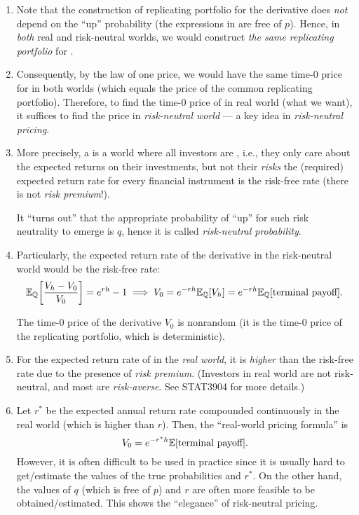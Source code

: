 \begin{enumerate}
\item Note that the construction of replicating portfolio for the derivative
 does \emph{not} depend on the ``up'' probability (the
expressions in  are free of \(p\)). Hence, in
\emph{both} real and risk-neutral worlds, we would construct \emph{the same
replicating portfolio} for .

\item Consequently, by the law of one price, we would have the same time-0 price
for  in both worlds (which equals the price of the common
replicating portfolio). Therefore, to find the time-0 price of 
in real world (what we want), it suffices to find the price in
\emph{risk-neutral world} --- a key idea in \emph{risk-neutral pricing}.

\item More precisely, a  is a world where all
investors are , i.e., they only care about the expected
returns on their investments, but not their \emph{risks} 
the (required) expected return rate for every financial instrument is the
risk-free rate (there is not \emph{risk premium}!).

\begin{note}
It ``turns out'' that the appropriate probability of ``up'' for such risk
neutrality to emerge is \(q\), hence it is called \emph{risk-neutral
probability}.
\end{note}


\item Particularly, the expected return rate of the derivative 
in the risk-neutral world would be the risk-free rate:
\[
\mathbb{E}_{\mathbb{Q}}\qty[\frac{V_h-V_0}{V_0}]=e^{rh}-1\implies
V_0=e^{-rh}\mathbb{E}_{\mathbb{Q}}\qty[V_h]
=e^{-rh}\mathbb{E}_{\mathbb{Q}}\qty[\text{terminal payoff}].
\]
\begin{note}
The time-0 price of the derivative \(V_0\) is nonrandom (it is the time-0
price of the replicating portfolio, which is deterministic).
\end{note}

\item For the expected return rate of  in the \emph{real world},
it is \emph{higher} than the risk-free rate due to the presence of \emph{risk
premium}. (Investors in real world are not risk-neutral, and most are
\emph{risk-averse}. See STAT3904 for more details.)

\item Let \(r^*\) be the expected annual return rate compounded continuously in
the real world (which is higher than \(r\)). Then, the ``real-world pricing
formula'' is
\[
V_0=e^{-r^*h}\mathbb{E}\qty[\text{terminal payoff}].
\]
However, it is often difficult to be used in practice since it is usually hard
to get/estimate the values of the true probabilities and \(r^*\). On the other
hand, the values of \(q\) (which is free of \(p\)) and \(r\) are often more
feasible to be obtained/estimated. This shows the ``elegance'' of risk-neutral
pricing.


\end{enumerate}
